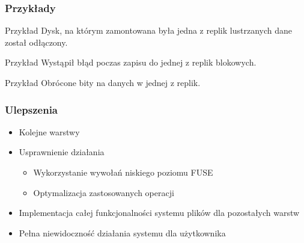 \documentclass{beamer}
\begin{document}
	\begin{frame}
		\frametitle{Przykłady}
		\begin{block}{Przykład}
			Dysk, na którym zamontowana była jedna z replik lustrzanych dane został odłączony. 
		\end{block}
		\pause
		\begin{block}{Przykład}
			Wystąpił błąd poczas zapisu do jednej z replik blokowych.
		\end{block}
		\pause
		\begin{block}{Przykład}
			Obrócone bity na danych w jednej z replik.
		\end{block}
	\end{frame}
	

	\begin{frame}
		\frametitle{Ulepszenia}
		\begin{itemize}
			\item Kolejne warstwy
			\item Usprawnienie działania
			\begin{itemize}
				\item Wykorzystanie wywołań niskiego poziomu FUSE
				\item Optymalizacja zastosowanych operacji
			\end{itemize}
			\item Implementacja całej funkcjonalności systemu plików dla pozostałych warstw
			\item Pełna niewidoczność działania systemu dla użytkownika
		\end{itemize}
	\end{frame}
\end{document}
